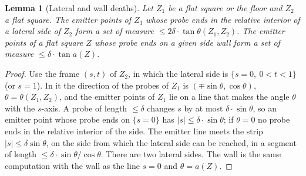 \documentclass[11pt,letterpaper]{amsart}
\theoremstyle{plain}
\newtheorem{lemma}[theorem]{Lemma}
\theoremstyle{definition}
\theoremstyle{remark}
\begin{document}
\begin{lemma}[Lateral and wall deaths]\label{lem:slateral}
Let $Z_1$ be a flat square or the floor and $Z_2$ a flat square. The emitter points of $Z_1$ whose probe ends in the relative interior of a lateral side of $Z_2$ form a set of measure $\le2\delta\cdot\tan\theta(Z_1,Z_2)$. The emitter points of a flat square $Z$ whose probe ends on a given side wall form a set of measure $\le\delta\cdot\tan a(Z)$.
\end{lemma}
\begin{proof}
Use the frame $(s,t)$ of $Z_2$, in which the lateral side is $\{s=0,\ 0<t<1\}$ (or $s=1$). In it the direction of the probes of $Z_1$ is $(\mp\sin\theta,\cos\theta)$, $\theta=\theta(Z_1,Z_2)$, and the emitter points of $Z_1$ lie on a line that makes the angle $\theta$ with the $s$-axis. A probe of length $\le\delta$ changes $s$ by at most $\delta\cdot\sin\theta$, so an emitter point whose probe ends on $\{s=0\}$ has $|s|\le\delta\cdot\sin\theta$; if $\theta=0$ no probe ends in the relative interior of the side. The emitter line meets the strip $|s|\le\delta\sin\theta$, on the side from which the lateral side can be reached, in a segment of length $\le\delta\cdot\sin\theta/\cos\theta$. There are two lateral sides. The wall is the same computation with the wall as the line $s=0$ and $\theta=a(Z)$.
\end{proof}
\end{document}

